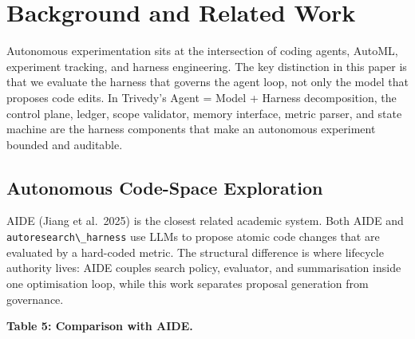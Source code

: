 \section{Background and Related Work}\label{background-and-related-work}

Autonomous experimentation sits at the intersection of coding agents, AutoML, experiment tracking, and harness engineering. The key distinction in this paper is that we evaluate the harness that governs the agent loop, not only the model that proposes code edits. In Trivedy's Agent = Model + Harness decomposition, the control plane, ledger, scope validator, memory interface, metric parser, and state machine are the harness components that make an autonomous experiment bounded and auditable.

\subsection{Autonomous Code-Space Exploration}\label{autonomous-code-space-exploration}

AIDE (Jiang et al.~2025) is the closest related academic system. Both AIDE and \passthrough{\lstinline!autoresearch\_harness!} use LLMs to propose atomic code changes that are evaluated by a hard-coded metric. The structural difference is where lifecycle authority lives: AIDE couples search policy, evaluator, and summarisation inside one optimisation loop, while this work separates proposal generation from governance.

\textbf{Table 5: Comparison with AIDE.}


